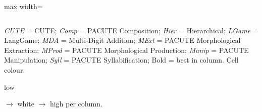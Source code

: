 \documentclass{article}
\begin{document}
\begin{table}[htbp]
\begin{threeparttable}
\begin{adjustbox}{max width=\textwidth}
\begin{tabular}{lrrrrrrrrrrrrrrrrrrrrrrrrrrrrrrrrrr}
\bottomrule
\end{tabular}
\end{adjustbox}
\begin{tablenotes}[flushleft]\footnotesize
\item \textit{CUTE} = CUTE; \textit{Comp} = PACUTE Composition; \textit{Hier} = Hierarchical; \textit{LGame} = LangGame; \textit{MDA} = Multi-Digit Addition; \textit{MExt} = PACUTE Morphological Extraction; \textit{MProd} = PACUTE Morphological Production; \textit{Manip} = PACUTE Manipulation; \textit{Syll} = PACUTE Syllabification; Bold = best in column. Cell colour: \colorbox[HTML]{F4A582}{\strut low} $\to$ white $\to$ \colorbox[HTML]{92C5DE}{high} per column.
\end{tablenotes}
\end{threeparttable}
\end{table}
\end{document}

